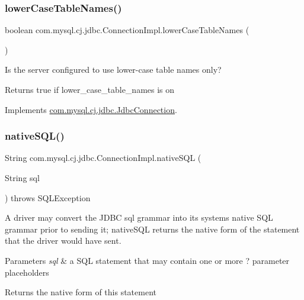 \subsubsection{\texorpdfstring{lower\+Case\+Table\+Names()}{lowerCaseTableNames()}}
{\footnotesize\ttfamily boolean com.\+mysql.\+cj.\+jdbc.\+Connection\+Impl.\+lower\+Case\+Table\+Names (\begin{DoxyParamCaption}{ }\end{DoxyParamCaption})}

Is the server configured to use lower-\/case table names only?

\begin{DoxyReturn}{Returns}
true if lower\+\_\+case\+\_\+table\+\_\+names is \textquotesingle{}on\textquotesingle{} 
\end{DoxyReturn}


Implements \mbox{\hyperlink{interfacecom_1_1mysql_1_1cj_1_1jdbc_1_1_jdbc_connection_a54cca6407a1a531b8e65ee3d965a51cd}{com.\+mysql.\+cj.\+jdbc.\+Jdbc\+Connection}}.

\mbox{\label{classcom_1_1mysql_1_1cj_1_1jdbc_1_1_connection_impl_a6c1d69bc49b04ac714fbe2e79062f2c1}} 
\subsubsection{\texorpdfstring{native\+S\+Q\+L()}{nativeSQL()}}
{\footnotesize\ttfamily String com.\+mysql.\+cj.\+jdbc.\+Connection\+Impl.\+native\+S\+QL (\begin{DoxyParamCaption}\item[{String}]{sql }\end{DoxyParamCaption}) throws S\+Q\+L\+Exception}

A driver may convert the J\+D\+BC sql grammar into its system\textquotesingle{}s native S\+QL grammar prior to sending it; native\+S\+QL returns the native form of the statement that the driver would have sent.


\begin{DoxyParams}{Parameters}
{\em sql} & a S\+QL statement that may contain one or more \textquotesingle{}?\textquotesingle{} parameter placeholders \\
\hline
\end{DoxyParams}
\begin{DoxyReturn}{Returns}
the native form of this statement 
\end{DoxyReturn}

